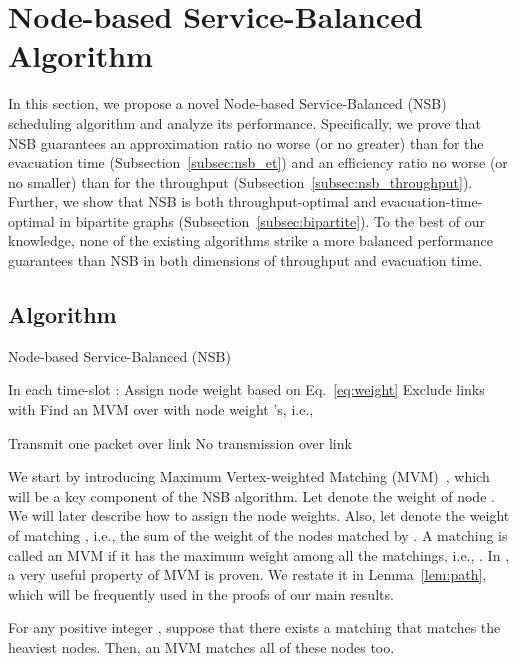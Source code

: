 \documentclass[10pt,journal,compsoc]{IEEEtran}
\begin{document}
\section{Node-based Service-Balanced Algorithm} \label{sec:nsb}
In this section, we propose a novel Node-based Service-Balanced (NSB) scheduling algorithm and 
analyze its performance. Specifically, we prove that NSB guarantees an approximation ratio no worse 
(or no greater) than  for the evacuation time (Subsection~\ref{subsec:nsb_et}) and an efficiency 
ratio no worse (or no smaller) than  for the throughput (Subsection~\ref{subsec:nsb_throughput}). 
Further, we show that NSB is both throughput-optimal and evacuation-time-optimal in bipartite graphs 
(Subsection~\ref{subsec:bipartite}). To the best of our knowledge, none of the existing algorithms strike 
a more balanced performance guarantees than NSB in both dimensions of throughput and evacuation time.

\subsection{Algorithm} \label{subsec:nsb_alg}



\begin{algorithm}[!t]
\caption{Node-based Service-Balanced (NSB)}
\begin{algorithmic}[1]
\label{alg:nsb}
\STATE In each time-slot :
\STATE Assign node weight  based on Eq.~\eqref{eq:weight}
\ENDFOR
\STATE Exclude links  with 
\STATE Find an MVM  over  with node weight 's, i.e., 

\IF{}
\STATE Transmit one packet over link 
\ELSE
\STATE No transmission over link 
\ENDIF
\ENDFOR
\end{algorithmic}
\end{algorithm} 

We start by introducing Maximum Vertex-weighted Matching (MVM)~\cite{spencer84,guptathesis}, 
which will be a key component of the NSB algorithm. Let  denote the weight of node . 
We will later describe how to assign the node weights. Also, let  
denote the weight of matching , i.e., the sum of the weight of the nodes matched by . A matching  is called 
an MVM if it has the maximum weight among all the matchings, i.e., . 
In \cite{spencer84}, a very useful property of MVM is proven.
We restate it in Lemma~\ref{lem:path}, which will be frequently used in 
the proofs of our main results.

\begin{lemma}
\label{lem:path}
For any positive integer , suppose that there exists a matching that matches the  
heaviest nodes. Then, an MVM matches all of these  nodes too.
\end{lemma}
\end{document}
